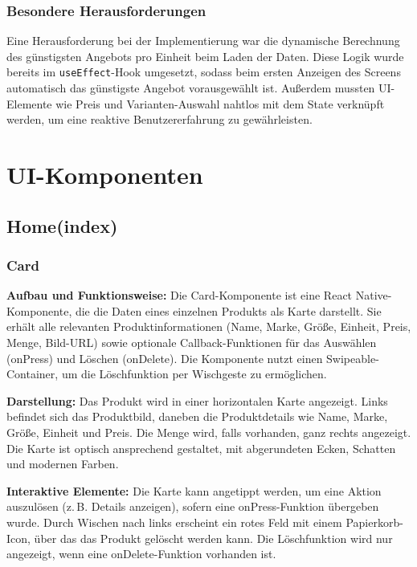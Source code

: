 \subsubsection{Besondere Herausforderungen}
Eine Herausforderung bei der Implementierung war die dynamische Berechnung des günstigsten Angebots pro Einheit beim Laden der Daten. Diese Logik wurde bereits im \texttt{useEffect}-Hook umgesetzt, sodass beim ersten Anzeigen des Screens automatisch das günstigste Angebot vorausgewählt ist. Außerdem mussten UI-Elemente wie Preis und Varianten-Auswahl nahtlos mit dem State verknüpft werden, um eine reaktive Benutzererfahrung zu gewährleisten. 



\clearpage

\section{UI-Komponenten}
\renewcommand{\authorinitials}{NK}

\label{sec:ui_komponenten}

\subsection{Home(index)}

\subsubsection{Card}

\noindent\textbf{Aufbau und Funktionsweise:}
Die Card-Komponente ist eine React Native-Komponente, die die Daten eines einzelnen Produkts als Karte darstellt. Sie erhält alle relevanten Produktinformationen (Name, Marke, Größe, Einheit, Preis, Menge, Bild-URL) sowie optionale Callback-Funktionen für das Auswählen (onPress) und Löschen (onDelete). Die Komponente nutzt einen Swipeable-Container, um die Löschfunktion per Wischgeste zu ermöglichen.

\noindent\textbf{Darstellung:}
Das Produkt wird in einer horizontalen Karte angezeigt. Links befindet sich das Produktbild, daneben die Produktdetails wie Name, Marke, Größe, Einheit und Preis. Die Menge wird, falls vorhanden, ganz rechts angezeigt. Die Karte ist optisch ansprechend gestaltet, mit abgerundeten Ecken, Schatten und modernen Farben.

\noindent\textbf{Interaktive Elemente:}
Die Karte kann angetippt werden, um eine Aktion auszulösen (z.\,B. Details anzeigen), sofern eine onPress-Funktion übergeben wurde. Durch Wischen nach links erscheint ein rotes Feld mit einem Papierkorb-Icon, über das das Produkt gelöscht werden kann. Die Löschfunktion wird nur angezeigt, wenn eine onDelete-Funktion vorhanden ist.

